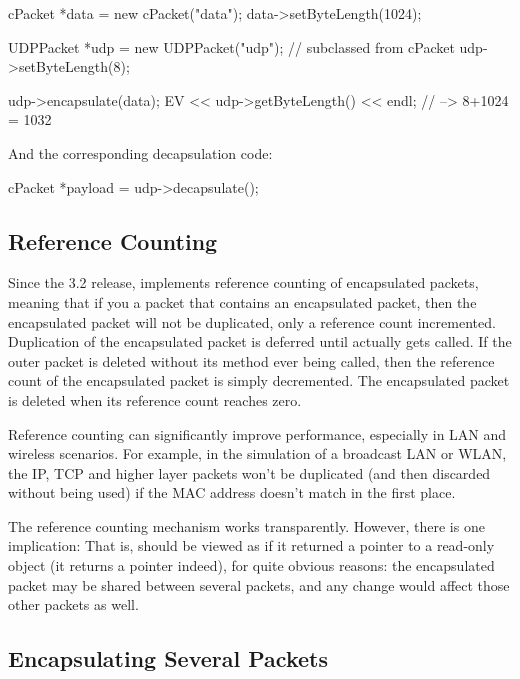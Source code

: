 \begin{cpp}
cPacket *data = new cPacket("data");
data->setByteLength(1024);

UDPPacket *udp = new UDPPacket("udp"); // subclassed from cPacket
udp->setByteLength(8);

udp->encapsulate(data);
EV << udp->getByteLength() << endl; // --> 8+1024 = 1032
\end{cpp}

And the corresponding decapsulation code:

\begin{cpp}
cPacket *payload = udp->decapsulate();
\end{cpp}



\subsection{Reference Counting}
\label{sec:messages:reference-counting}

Since the 3.2 release, {\opp} implements reference counting of
encapsulated packets, meaning that if you  a packet
that contains an encapsulated packet, then the encapsulated packet will
not be duplicated, only a reference count incremented. Duplication of
the encapsulated packet is deferred until 
actually gets called. If the outer packet is deleted without its
 method ever being called, then the reference
count of the encapsulated packet is simply decremented. The
encapsulated packet is deleted when its reference count reaches
zero.

Reference counting can significantly improve performance, especially
in LAN and wireless scenarios. For example, in the simulation of a
broadcast LAN or WLAN, the IP, TCP and higher layer packets won't
be duplicated (and then discarded without being used) if the
MAC address doesn't match in the first place.

The reference counting mechanism works transparently. However, there
is one implication:  That is,
 should be viewed as if it returned a
pointer to a read-only object (it returns a  pointer
indeed), for quite obvious reasons: the encapsulated packet may be
shared between several packets, and any change would affect those
other packets as well.


\subsection{Encapsulating Several Packets}

